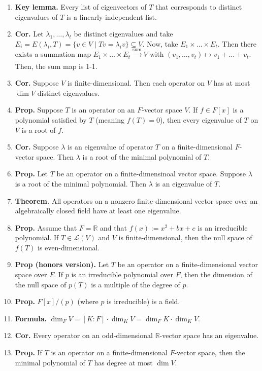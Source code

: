 \begin{enumerate}
	\item \textbf{Key lemma. } Every list of eigenvectors of $T$ that corresponds to distinct eigenvalues of $T$ is a linearly independent list. 
	\item \textbf{Cor. } Let $\lambda_1,\dots,\lambda_t$ be distinct eigenvalues and take $E_i = E(\lambda_i,T) = \{v \in V \mid Tv = \lambda_iv\} \subseteq V$. Now, take $E_1 \times \dots \times E_t$. Then there exists a summation map $E_1 \times \dots \times E_t \xrightarrow[]{\textrm{sum}} V$ with $(v_1,\dots,v_t) \mapsto v_1 + \dots + v_t$. Then, the sum map is 1-1. 
	\item \textbf{Cor. } Suppose $V$ is finite-dimensional. Then each operator on $V$ has at most $\dim V$ distinct eigenvalues. 
	\item \textbf{Prop. } Suppose $T$ is an operator on an $F$-vector space $V$. If $f \in F[x]$ is a polynomial satisfied by $T$ (meaning $f(T)=0$), then every eigenvalue of $T$ on $V$ is a root of $f$. 
	\item \textbf{Cor. } Suppose $\lambda$ is an eigenvalue of operator $T$ on a finite-dimensional $F$-vector space. Then $\lambda$ is a root of the minimal polynomial of $T$. 
	\item \textbf{Prop. } Let $T$ be an operator on a finite-dimensinoal vector space. Suppose $\lambda$ is a root of the minimal polynomial. Then $\lambda$ is an eigenvalue of $T$. 
	\item \textbf{Theorem. } All operators on a nonzero finite-dimensional vector space over an algebraically closed field have at least one eigenvalue. 
	\item \textbf{Prop. } Assume that $F = \mathbb{R}$ and that $f(x) := x^2 + bx + c$ is an irreducible polynomial. If $T \in \mathscr{L}(V)$ and $V$ is finite-dimensional, then the null space of $f(T)$ is even-dimensional. 
	\item \textbf{Prop (honors version). } Let $T$ be an operator on a finite-dimensional vector space over $F$. If $p$ is an irreducible polynomial over $F$, then the dimension of the null space of $p(T)$ is a multiple of the degree of $p$. 
	\item \textbf{Prop. } $F[x] / (p)$ (where $p$ is irreducible) is a field. 
	\item \textbf{Formula. } $\dim_F V = [K:F] \cdot \dim_K V = \dim_F K \cdot \dim_K V$. 
	\item \textbf{Cor. } Every operator on an odd-dimensional $\mathbb{R}$-vector space has an eigenvalue. 
	\item \textbf{Prop. } If $T$ is an operator on a finite-dimensional $F$-vector space, then the minimal polynomial of $T$ has degree at most $\dim V$. 

\end{enumerate}
